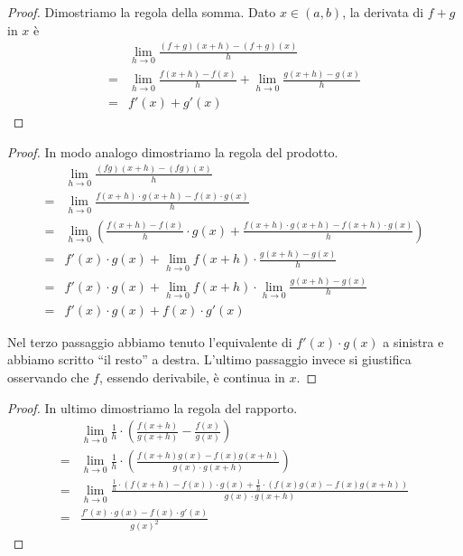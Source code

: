 \begin{proof}
Dimostriamo la regola della somma. Dato $x \in (a,b)$, la derivata di $f+g$ in $x$ è
\begin{equation*}
\end{equation*}
\begingroup
\addtolength{\jot}{1ex}
\begin{align*}
& \lim_{h \to 0} \frac{(f+g)(x+h) - (f+g)(x)}{h} \\
= &\lim_{h \to 0} \frac{f(x+h)-f(x)}{h} + \lim_{h \to 0} \frac{g(x+h)-g(x)}{h} \\
= &f'(x) + g'(x)
\end{align*}
\endgroup
\end{proof}

\begin{proof}
In modo analogo dimostriamo la regola del prodotto.
\begingroup
\addtolength{\jot}{1ex}
\begin{align*}
& \lim_{h \to 0} \frac{(fg)(x+h) - (fg)(x)}{h} \\
= &\lim_{h \to 0} \frac{f(x+h) \cdot g(x+h) - f(x) \cdot g(x)}{h} \\
= &\lim_{h \to 0} \left( \frac{f(x+h)-f(x)}{h} \cdot g(x) + \frac{f(x+h) \cdot g(x+h) - f(x+h) \cdot g(x)}{h} \right) \\
= &f'(x) \cdot g(x) + \lim_{h \to 0} f(x+h) \cdot \frac{g(x+h) - g(x)}{h} \\
= &f'(x) \cdot g(x) + \lim_{h \to 0} f(x+h) \cdot \lim_{h \to 0} \frac{g(x+h) - g(x)}{h} \\
= & f'(x) \cdot g(x) + f(x) \cdot g'(x)
\end{align*}
\endgroup

Nel terzo passaggio abbiamo tenuto l'equivalente di $f'(x) \cdot g(x)$ a sinistra e abbiamo scritto ``il resto'' a destra. L'ultimo passaggio invece si giustifica osservando che $f$, essendo derivabile, è continua in $x$.
\end{proof}

\begin{proof}
In ultimo dimostriamo la regola del rapporto.
\begingroup
\addtolength{\jot}{1ex}
\begin{align*}
& \lim_{h \to 0} \frac{1}{h} \cdot \left( \frac{f(x+h)}{g(x+h)} - \frac{f(x)}{g(x)} \right) \\
= & \lim_{h \to 0} \frac{1}{h} \cdot \left( \frac{f(x+h)g(x) - f(x)g(x+h)}{g(x) \cdot g(x+h)} \right) \\
= & \lim_{h \to 0} \frac{\frac{1}{h} \cdot (f(x+h)-f(x)) \cdot g(x) + \frac{1}{h} \cdot (f(x)g(x) - f(x)g(x+h))}{g(x) \cdot g(x+h)} \\
= & \frac{f'(x) \cdot g(x) - f(x) \cdot g'(x)}{g(x)^2}
\end{align*}
\endgroup
\end{proof}

